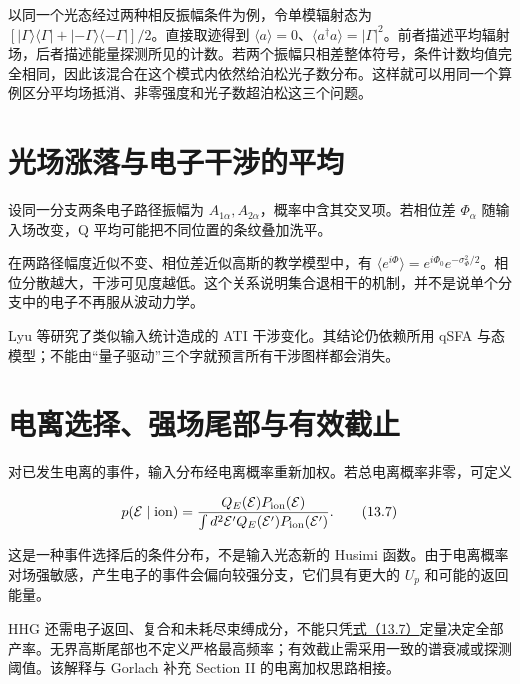 \documentclass[UTF8,a4paper,zihao=-4,openany,fontset=fandol]{ctexbook}
\begin{document}
以同一个光态经过两种相反振幅条件为例，令单模辐射态为 $[|\Gamma\rangle\langle\Gamma|+|-\Gamma\rangle\langle-\Gamma|]/2$。直接取迹得到 $\langle a\rangle=0$、$\langle a^\dagger a\rangle=|\Gamma|^2$。前者描述平均辐射场，后者描述能量探测所见的计数。若两个振幅只相差整体符号，条件计数均值完全相同，因此该混合在这个模式内依然给泊松光子数分布。这样就可以用同一个算例区分平均场抵消、非零强度和光子数超泊松这三个问题。



\section{光场涨落与电子干涉的平均}\label{sec:13:9}


设同一分支两条电子路径振幅为 $A_{1\alpha},A_{2\alpha}$，概率中含其交叉项。若相位差 $\Phi_\alpha$ 随输入场改变，Q 平均可能把不同位置的条纹叠加洗平。



在两路径幅度近似不变、相位差近似高斯的教学模型中，有 $\langle e^{i\Phi}\rangle=e^{i\Phi_0}e^{-\sigma_\Phi^2/2}$。相位分散越大，干涉可见度越低。这个关系说明集合退相干的机制，并不是说单个分支中的电子不再服从波动力学。



Lyu 等研究了类似输入统计造成的 ATI 干涉变化。其结论仍依赖所用 qSFA 与态模型；不能由“量子驱动”三个字就预言所有干涉图样都会消失。



\section{电离选择、强场尾部与有效截止}\label{sec:13:10}


对已发生电离的事件，输入分布经电离概率重新加权。若总电离概率非零，可定义



\begin{equation*}
p(\mathcal E\mid\mathrm{ion})=
\frac{Q_E(\mathcal E)P_{\rm ion}(\mathcal E)}
{\int d^2\mathcal E'Q_E(\mathcal E')P_{\rm ion}(\mathcal E')}.
\tag{13.7}\label{eq:13.7}
\end{equation*}


这是一种事件选择后的条件分布，不是输入光态新的 Husimi 函数。由于电离概率对场强敏感，产生电子的事件会偏向较强分支，它们具有更大的 $U_p$ 和可能的返回能量。



HHG 还需电子返回、复合和未耗尽束缚成分，不能只凭\hyperref[eq:13.7]{式（13.7）}定量决定全部产率。无界高斯尾部也不定义严格最高频率；有效截止需采用一致的谱衰减或探测阈值。该解释与 Gorlach 补充 Section II 的电离加权思路相接。
\end{document}
